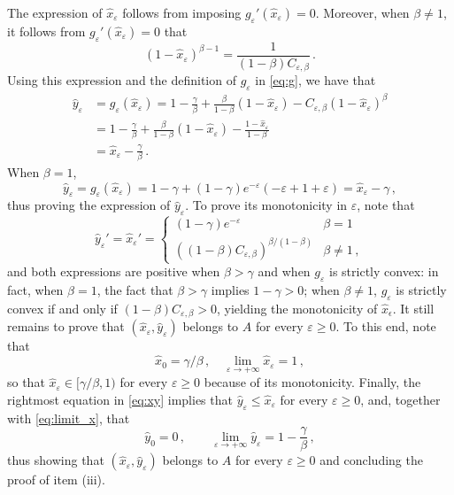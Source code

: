 \documentclass{article}
\begin{document}
        The expression of $\hat x_\varepsilon$ follows from imposing $g_\varepsilon'(\hat x_\varepsilon) = 0$. Moreover, when $\beta \neq 1$, it follows from $g_\varepsilon'(\hat x_\varepsilon) = 0$
        that
        $$
        (1-\hat x_\varepsilon)^{\beta-1} = \frac{1}{(1-\beta)C_{\varepsilon,\beta}}\,.
        $$
        Using this expression and the definition of $g_\varepsilon$ in \eqref{eq:g}, we have that
        $$
        \begin{aligned}
        \hat y_\varepsilon & = g_\varepsilon(\hat x_\varepsilon) = 1 - \frac{\gamma}{\beta} + \frac{\beta}{1-\beta}(1-\hat x_\varepsilon) - C_{\varepsilon,\beta}(1-\hat x_\varepsilon)^{\beta} \\
        & = 1 - \frac{\gamma}{\beta} + \frac{\beta}{1-\beta}(1-\hat x_\varepsilon) - \frac{1-\hat x_{\varepsilon}}{1-\beta} \\
        & = \hat x_\varepsilon - \frac{\gamma}{\beta}\,.
        \end{aligned}
        $$
        When $\beta = 1$,
        $$
        \hat y_\varepsilon = g_\varepsilon(\hat x_\varepsilon) = 1 - \gamma + (1-\gamma)e^{-\varepsilon}(-\varepsilon + 1 + \varepsilon) = \hat x_\varepsilon - \gamma\,,
        $$
        thus proving the expression of $\hat y_\varepsilon$. To prove its monotonicity in $\varepsilon$, note that
        \begin{equation}\label{der1:xy}
        \hat y_\varepsilon' = \hat x_\varepsilon' = \begin{cases}
        (1-\gamma) e^{-\varepsilon} \quad & \beta = 1\\
        ((1-\beta)C_{\varepsilon,\beta})^{\beta/(1-\beta)} & \beta \neq 1\,,
        \end{cases}
        \end{equation}
        and both expressions are positive when $\beta > \gamma$ and when $g_\varepsilon$ is strictly convex: in fact, when $\beta = 1$, the fact that $\beta > \gamma$ implies $1-\gamma>0$; when $\beta \neq 1$, $g_\varepsilon$ is strictly convex if and only if $(1-\beta)C_{\varepsilon,\beta}>0$, yielding the monotonicity of $\hat x_\epsilon$. It still remains to prove that $(\hat x_\varepsilon, \hat y_\varepsilon)$ belongs to $A$ for every $\varepsilon \ge 0$. To this end, note that 
        \begin{equation}\label{eq:limit_x}
        \hat x_0 = \gamma/\beta\,, \quad \lim_{\varepsilon \to +\infty} \hat x_\varepsilon = 1\,,
        \end{equation}
        so that $\hat x_\varepsilon \in [\gamma/\beta,1)$ for every $\varepsilon \ge 0$ because of its monotonicity. Finally, the rightmost equation in \eqref{eq:xy} implies that $\hat y_\varepsilon \le \hat x_{\varepsilon}$ for every $\varepsilon \ge 0$, and, together with \eqref{eq:limit_x}, that
        $$
        \hat y_0 = 0\,, \qquad \lim_{\varepsilon \to +\infty} \hat y_{\varepsilon} = 1-\frac{\gamma}{\beta}\,,
        $$
        thus showing that $(\hat x_\varepsilon,\hat y_\varepsilon)$ belongs to $A$ for every $\varepsilon \ge 0$ and concluding the proof of item (iii).
\end{document}
